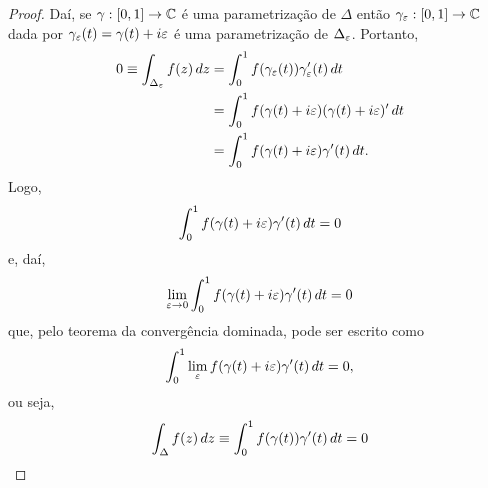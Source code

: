 \begin{proof}
        Daí, se $\gamma:[0,1]\to\mathbb{C}$ é uma parametrização de $\Delta$ então
        $\gamma_{\varepsilon}:[0,1]\to\mathbb{C}$ dada por 
        $\gamma_{\varepsilon}(t) = \gamma(t) + i\varepsilon$ é uma parametrização de
        $\Delta_{\varepsilon}$. Portanto,
        \begin{align*}
            0 \equiv \int_{\Delta_{\varepsilon}} f(z)\, dz 
            &= \int_0^1 f(\gamma_{\varepsilon}(t))\gamma_{\varepsilon}'(t)\, dt \\
            &= \int_0^1 f(\gamma(t) + i\varepsilon)(\gamma(t) + i\varepsilon)'\, dt \\
            &= \int_0^1 f(\gamma(t) + i\varepsilon)\gamma'(t)\, dt.
        \end{align*}
        Logo, 
        \begin{equation*}
            \int_0^1 f(\gamma(t) + i\varepsilon)\gamma'(t)\, dt = 0
        \end{equation*}
        e, daí,
        \begin{align*}
            \lim_{\varepsilon\to 0} \int_0^1 f(\gamma(t) + i\varepsilon)\gamma'(t)\, dt = 0
        \end{align*}
        que, pelo teorema da convergência dominada, pode ser escrito como
        \begin{equation*}
            \int_0^1 \lim_{\varepsilon}f(\gamma(t) + i\varepsilon)\gamma'(t)\, dt = 0,
        \end{equation*}
        ou seja,
        \begin{equation*}
            \int_{\Delta} f(z)\, dz \equiv \int_0^1 f(\gamma(t))\gamma'(t)\, dt = 0
        \end{equation*}

\end{proof}
